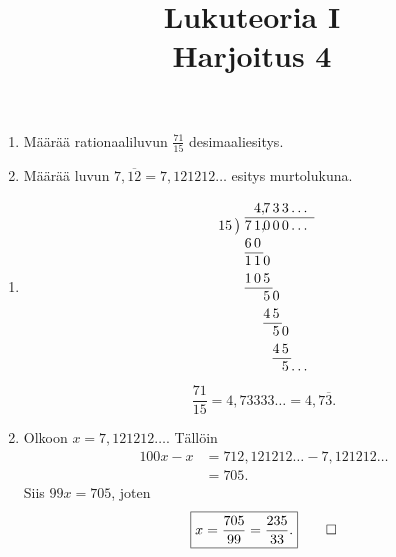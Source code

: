 \documentclass[11pt,a4paper]{amsart}
\title{Lukuteoria I\\Harjoitus 4}
\author{}
\date{}
\begin{document}

\begin{exercise}
  \leavevmode\par
  \begin{enumerate}[label=(\alph*), topsep=0.35em]
    \item Määrää rationaaliluvun \(\frac{71}{15}\) desimaaliesitys.
    \item Määrää luvun \(7{,}\overline{12} = 7{,}121212\ldots\)
      esitys murtolukuna.
  \end{enumerate}
\end{exercise}

\begin{solution}
  \leavevmode\par
  \begin{enumerate}[label=(\alph*), topsep=0.35em]
    \item
      \[
        \renewcommand{\arraystretch}{1.05}
        \begin{array}{r@{\;}r@{\mkern3mu}r@{\mkern3mu}r@{\mkern3mu}r@{\mkern3mu}r@{\mkern3mu}l}
          & & 4\mathrlap{{,}} & 7 & 3 & 3 & \ldots \\
          \cline{2-7}
        15\,\big) & 7 & 1\mathrlap{{,}} & 0 & 0 & 0 & \ldots \\
        & 6 & 0 & & & & \\
        \cline{2-3}
        & 1 & 1 & 0 & & & \\
        & 1 & 0 & 5 & & & \\
        \cline{2-4}
        & & & 5 & 0 & & \\
        & & & 4 & 5 & & \\
        \cline{4-5}
        & & & & 5 & 0 & \\
        & & & & 4 & 5 & \\
        \cline{5-6}
        & & & & & 5 & \ldots
      \end{array}
    \]
    \[
      \boxed{\frac{71}{15}=4{,}73333\ldots=4{,}7\overline{3}.}
    \]
  \item Olkoon \(x=7{,}121212\ldots\). Tällöin
    \[
      \begin{aligned}
        100x-x
        &=712{,}121212\ldots-7{,}121212\ldots\\
        &=705.
      \end{aligned}
    \]
    Siis \(99x=705\), joten
    \[
      \boxed{x=\frac{705}{99}=\frac{235}{33}.}\qedhere
    \]
\end{enumerate}
\end{solution}
\end{document}
